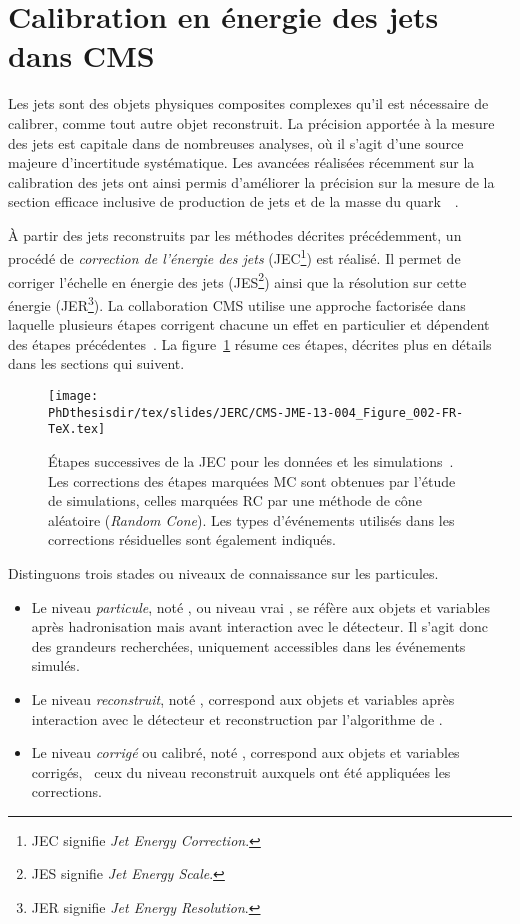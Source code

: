 \section{Calibration en énergie des jets dans CMS}\label{chapter-JERC-section-CMS}
Les jets sont des objets physiques composites complexes qu'il est nécessaire de calibrer, comme tout autre objet reconstruit.
La précision apportée à la mesure des jets est capitale dans de nombreuses analyses, où il s'agit d'une source majeure d'incertitude systématique.
Les avancées réalisées récemment sur la calibration des jets ont ainsi permis d'améliorer la précision sur la mesure de la section efficace inclusive de production de jets et de la masse du quark~\quarkt~\cite{JERC_RunI}.
\par À partir des jets reconstruits par les méthodes décrites précédemment, un procédé de \emph{correction de l'énergie des jets} (JEC\footnote{JEC signifie \emph{Jet Energy Correction}.}) est réalisé.
Il permet de corriger l'échelle en énergie des jets (JES\footnote{JES signifie \emph{Jet Energy Scale}.}) ainsi que la résolution sur cette énergie (JER\footnote{JER signifie \emph{Jet Energy Resolution}.}).
La collaboration CMS utilise une approche factorisée dans laquelle plusieurs étapes corrigent chacune un effet en particulier et dépendent des étapes précédentes~\cite{JERC_RunI}.
La figure~\ref{fig-CMS-JME-13-004_Figure_002-TeX} résume ces étapes, décrites plus en détails dans les sections qui suivent.
\begin{figure}[h]
\centering
\texttt{[image: \\PhDthesisdir/tex/slides/JERC/CMS-JME-13-004\_Figure\_002-FR-TeX.tex]}
\caption[Étapes successives de la JEC.]{Étapes successives de la JEC pour les données et les simulations~\cite{JERC_RunI}. Les corrections des étapes marquées \og MC \fg{} sont obtenues par l'étude de simulations, celles marquées \og RC \fg{} par une méthode de cône aléatoire (\emph{Random Cone}). Les types d'événements utilisés dans les corrections résiduelles sont également indiqués.}
\label{fig-CMS-JME-13-004_Figure_002-TeX}
\end{figure}
\par Distinguons trois stades ou \og niveaux \fg{} de connaissance sur les particules.
\begin{itemize}
\item Le niveau \emph{particule}, noté \ptcl, ou niveau \og vrai \fg{}, se réfère aux objets et variables après hadronisation mais avant interaction avec le détecteur. Il s'agit donc des grandeurs recherchées, uniquement accessibles dans les événements simulés.
\item Le niveau \emph{reconstruit}, noté \reco, correspond aux objets et variables après interaction avec le détecteur et reconstruction par l'algorithme de \PF.
\item Le niveau \emph{corrigé} ou calibré, noté \cali, correspond aux objets et variables corrigés, \ie\ ceux du niveau reconstruit auxquels ont été appliquées les corrections.
\end{itemize}
